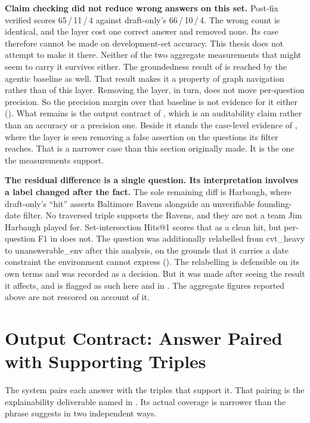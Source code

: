 \textbf{Claim checking did not reduce wrong answers on this set.} Post-fix
verified scores 65\,/\,11\,/\,4 against draft-only's 66\,/\,10\,/\,4. The wrong
count is identical, and the layer cost one correct answer and removed none. Its
case therefore cannot be made on development-set accuracy. This thesis does not
attempt to make it there. Neither of the two aggregate measurements that might
seem to carry it survives  either. The groundedness result of
 is reached by the agentic baseline as well. That
result makes it a property of graph navigation rather than of this layer.
Removing the layer, in turn, does not move per-question precision. So the
precision margin over that baseline is not evidence for it either
(). What remains is the output contract of
, which is an auditability claim rather than an
accuracy or a precision one. Beside it stands the case-level evidence of
, where the layer is seen removing a false
assertion on the questions its filter reaches. That is a narrower case than this
section originally made. It is the one the measurements support.

\textbf{The residual difference is a single question. Its interpretation
involves a label changed after the fact.} The sole remaining diff is Harbaugh,
where draft-only's ``hit'' asserts Baltimore Ravens alongside an unverifiable
founding-date filter. No traversed triple supports the Ravens, and they are not
a team Jim Harbaugh played for. Set-intersection Hits@1 scores that as a clean
hit, but per-question F1 in  does not. The question was
additionally relabelled from \textsf{cvt\_heavy} to \textsf{unanswerable\_env}
after this analysis, on the grounds that it carries a date constraint the
environment cannot express (). The relabelling is
defensible on its own terms and was recorded as a decision. But it was made
after seeing the result it affects, and is flagged as such here and in
. The aggregate figures reported above are not rescored on
account of it.

\section{Output Contract: Answer Paired with Supporting
Triples}\label{sec:output-contract}

The system pairs each answer with the triples that support it. That pairing is
the explainability deliverable named in . Its actual
coverage is narrower than the phrase suggests in two independent ways.

